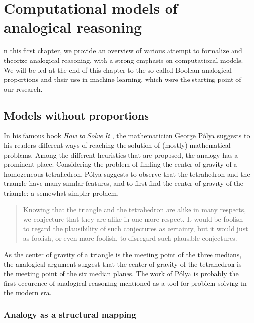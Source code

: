\chapter{Computational models of analogical reasoning}
\label{chapter:1}


n this first chapter, we provide an overview of various attempt to
formalize and theorize analogical reasoning, with a strong emphasis on
computational models. We will be led at the end of this chapter to the so
called Boolean analogical proportions and their use in machine learning, which
were the starting point of our research.

\section{Models without proportions}
\label{sec:models_without_proportions}

In his famous book \textit{How to Solve It} \cite{Pol45}, the mathematician
George P\'olya suggests to his readers different ways of reaching the solution
of (mostly) mathematical problems. Among the different heuristics that are
proposed, the analogy has a prominent place. Considering the problem of finding
the center of gravity of a homogeneous tetrahedron, P\'olya suggests to observe
that the tetrahedron and the triangle have many similar features, and to first
find the center of gravity of the triangle: a somewhat simpler problem.

\begin{quote}
Knowing that the triangle and the tetrahedron are alike in many respects, we
  conjecture that they are alike in one more respect. It would be foolish to
  regard the plausibility of such conjectures as certainty, but it would just
  as foolish, or even more foolish, to disregard such plausible conjectures.
\end{quote}

As the center of gravity of a triangle is the meeting point of the three
medians, the analogical argument suggest that the center of gravity of the
tetrahedron is the meeting point of the six median planes. The work of P\'olya
is probably the first occurence of analogical reasoning mentioned as a tool for
problem solving in the modern era.

\subsection{Analogy as a structural mapping}

